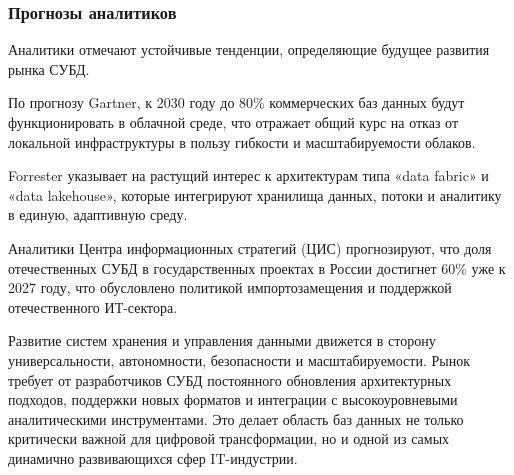 \subsubsection{Прогнозы аналитиков}

Аналитики отмечают устойчивые тенденции, определяющие будущее развития рынка СУБД. 

По прогнозу Gartner, к 2030 году до 80\% коммерческих баз данных будут функционировать в облачной среде, что отражает общий курс на отказ от локальной инфраструктуры в пользу гибкости и масштабируемости облаков. 

Forrester указывает на растущий интерес к архитектурам типа «data fabric» и «data lakehouse», которые интегрируют хранилища данных, потоки и аналитику в единую, адаптивную среду. 

Аналитики Центра информационных стратегий (ЦИС) прогнозируют, что доля отечественных СУБД в государственных проектах в России достигнет 60\% уже к 2027 году, что обусловлено политикой импортозамещения и поддержкой отечественного ИТ-сектора.

Развитие систем хранения и управления данными движется в сторону универсальности, автономности, безопасности и масштабируемости. Рынок требует от разработчиков СУБД постоянного обновления архитектурных подходов, поддержки новых форматов и интеграции с высокоуровневыми аналитическими инструментами. Это делает область баз данных не только критически важной для цифровой трансформации, но и одной из самых динамично развивающихся сфер IT-индустрии.